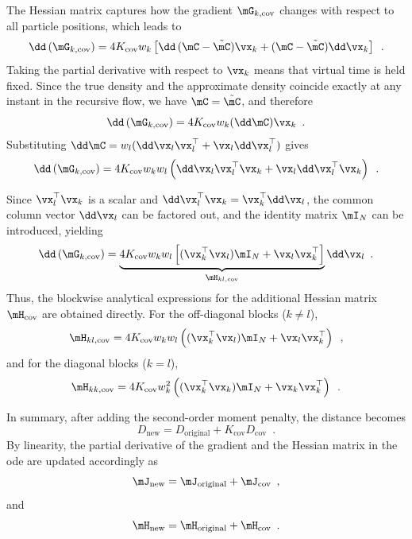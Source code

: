 The Hessian matrix captures how the gradient $\mG_{k,\text{cov}}$ changes with respect to all particle positions, which leads to
\begin{equation}
	\dd\,(\mG_{k, \text{cov}}) = 4 K_{\text{cov}} w_k \left[ \dd\,(\mC - \tilde{\mC}) \vx_k + (\mC - \tilde{\mC}) \dd\vx_k \right] \enspace.
\end{equation}
Taking the partial derivative with respect to $\vx_k$ means that virtual time is held fixed. Since the true density and the approximate density coincide exactly at any instant in the recursive flow, we have $\mC = \tilde{\mC}$, and therefore
\begin{equation}
	\dd\,(\mG_{k, \text{cov}}) = 4 K_{\text{cov}} w_k (\dd\mC) \vx_k \enspace.
\end{equation}
Substituting $\dd\mC = w_l (\dd\vx_l \vx_l^{\top} + \vx_l \dd\vx_l^{\top})$ gives
\begin{equation}
	\dd\,(\mG_{k, \text{cov}}) = 4 K_{\text{cov}} w_k w_l \left( \dd\vx_l \vx_l^{\top} \vx_k + \vx_l \dd\vx_l^{\top} \vx_k \right) \enspace.
\end{equation}

Since $\vx_l^{\top} \vx_k$ is a scalar and $\dd\vx_l^{\top} \vx_k = \vx_k^{\top} \dd\vx_l$, the common column vector $\dd\vx_l$ can be factored out, and the identity matrix $\mI_N$ can be introduced, yielding
\begin{equation}
	\dd\,(\mG_{k, \text{cov}}) = \underbrace{4 K_{\text{cov}} w_k w_l \left[ (\vx_k^{\top} \vx_l) \mI_N + \vx_l \vx_k^{\top} \right]}_{\mH_{kl, \text{cov}}} \dd\vx_l \enspace.
\end{equation}
Thus, the blockwise analytical expressions for the additional Hessian matrix $\mH_{\text{cov}}$ are obtained directly. For the off-diagonal blocks ($k \neq l$),
\begin{equation}
	\mH_{kl, \text{cov}} = 4 K_{\text{cov}} w_k w_l \left( (\vx_k^{\top} \vx_l) \mI_N + \vx_l \vx_k^{\top} \right) \enspace,
\end{equation}
and for the diagonal blocks ($k = l$),
\begin{equation}
	\mH_{kk, \text{cov}} = 4 K_{\text{cov}} w_k^2 \left( (\vx_k^{\top} \vx_k) \mI_N + \vx_k \vx_k^{\top} \right) \enspace.
\end{equation}

In summary, after adding the second-order moment penalty, the distance becomes
\begin{equation}
	D_{\text{new}} = D_{\text{original}} + K_{\text{cov}} D_{\text{cov}} \enspace.
\end{equation}
By linearity, the partial derivative of the gradient and the Hessian matrix in the \ac{ode} are updated accordingly as
\begin{equation}
	\mJ_{\text{new}} = \mJ_{\text{original}} + \mJ_{\text{cov}} \enspace,
\end{equation}
and
\begin{equation}
	\mH_{\text{new}} = \mH_{\text{original}} + \mH_{\text{cov}} \enspace.
\end{equation}

